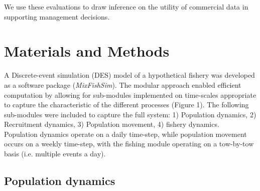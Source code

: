\documentclass[review]{elsarticle}
\begin{document}
We use these evaluations to draw inference on the utility of commercial data in
supporting management decisions.  

\section{Materials and Methods}

A Discrete-event simulation (DES) model of a hypothetical fishery was developed
as a software package (\textit{MixFishSim}). The modular approach enabled
efficient computation by allowing for sub-modules implemented on time-scales
appropriate to capture the characteristic of the different processes (Figure
1). The following sub-modules were included to capture the full system: 1)
Population dynamics, 2) Recruitment dynamics, 3) Population movement, 4)
fishery dynamics.\\

Population dynamics operate on a daily time-step, while population movement
occurs on a weekly time-step, with the fishing module operating on a tow-by-tow
basis (i.e.  multiple events a day). 

\subsection{Population dynamics}
\end{document}
